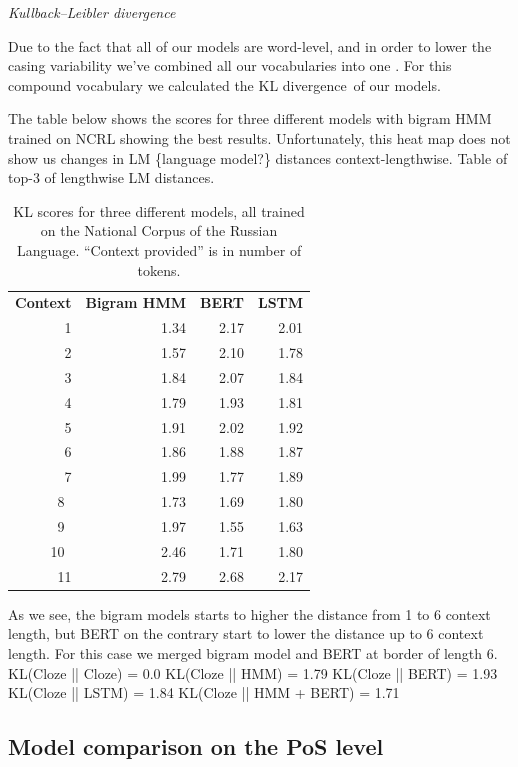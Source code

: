 \documentclass[a4paper]{article}
\newcommand{\head}[1]{\vspace{0.5em}\emph{#1}\vspace{0.25em}}
\begin{document}

\head{Kullback–Leibler divergence} %

Due to the fact that all of our models are word-level, and in order to lower the casing variability we've combined all our vocabularies into one
. For this compound vocabulary we calculated the KL divergence of our models.

The table below shows the scores for three different models with
bigram HMM trained on NCRL showing the best results. Unfortunately,
this heat map does not show us changes in LM \{language model?\} distances context-lengthwise. Table of top-3 of lengthwise LM distances.

\begin{table}
\centering

\caption{KL scores for three different models, all trained on the
National Corpus of the Russian Language. ``Context provided'' is in number
of tokens.}

\begin{tabular}{rrrr}
\textbf{Context} &
\textbf{Bigram HMM} &
\textbf{BERT} &
\textbf{LSTM} \\
1 &
1.34 &
2.17 &
2.01 \\
2 &
1.57 &
2.10 &
1.78 \\
3 &
1.84 &
2.07 &
1.84 \\
4 &
1.79 &
1.93 &
1.81 \\
5 &
1.91 &
2.02 &
1.92 \\
6 &
1.86 &
1.88 &
1.87 \\
7 &
1.99 &
1.77 &
1.89 \\
8 &
1.73 &
1.69 &
1.80 \\
9 &
1.97 &
1.55 &
1.63 \\
10 &
2.46 &
1.71 &
1.80 \\
11 &
2.79 &
2.68 &
2.17
\end{tabular}
\end{table}

As we see, the bigram models starts to higher the distance from 1 to 6 context length, but BERT on the contrary start to lower the distance up to 6 context length. For this case we merged bigram model and BERT at border of length 6.
KL(Cloze || Cloze) = 0.0
KL(Cloze || HMM) = 1.79
KL(Cloze || BERT) = 1.93
KL(Cloze || LSTM) = 1.84
KL(Cloze || HMM + BERT) = 1.71

\subsection{Model comparison on the PoS level} %
\end{document}
